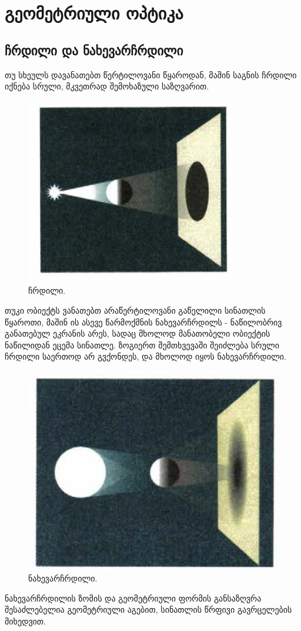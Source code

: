 \documentclass[a4paper]{book}
\begin{document}
\chapter{გეომეტრიული ოპტიკა}
\section{ჩრდილი და ნახევარჩრდილი} 
თუ სხეულს დავანათებთ წერტილოვანი წყაროდან, მაშინ საგნის ჩრდილი იქნება სრული, მკვეთრად შემოხაზული საზღვარით. 
		\begin{figure}[H]
		   \centering
           \includegraphics[width=0.3\columnwidth]{figures/shadow}
           \caption{ჩრდილი.}
           \label{fig:shadow}
        \end{figure}
        
თუკი ობიექტს ვანათებთ არაწერტილოვანი გაწელილი სინათლის წყაროთი, მაშინ ის ასევე წარმოქმნის ნახევარჩრდილს - ნაწილობრივ განათებულ ეკრანის არეს, სადაც მხოლოდ მანათობელი ობიექტის ნაწილიდან ეცემა სინათლე. ზოგიერთ შემთხვევაში შეიძლება სრული ჩრდილი საერთოდ არ გვქონდეს, და მხოლოდ იყოს ნახევარჩრდილი.
		\begin{figure}[H]
		   \centering
           \includegraphics[width=0.3\columnwidth]{figures/penumbra}
           \caption{ნახევარჩრდილი.}
           \label{fig:penumbra}
        \end{figure}
        
ნახევარჩრდილის ზომის და გეომეტრიული ფორმის განსაზღვრა შესაძლებელია გეომეტრიული აგებით, სინათლის წრფივი გავრცელების მიხედვით.
\end{document}
